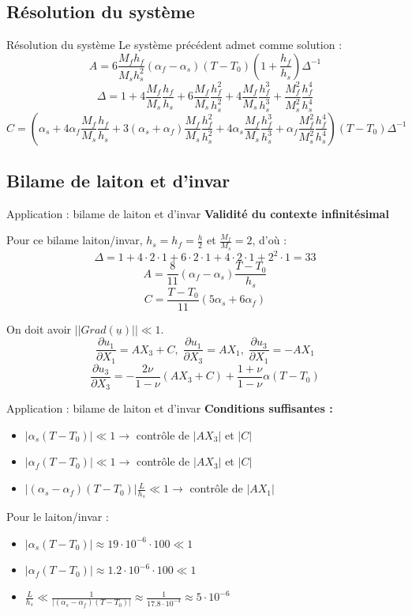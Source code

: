 \documentclass{beamer}
\begin{document}
\subsection{Résolution du système}

\begin{frame}{Résolution du système}
    Le système précédent admet comme solution :
    $$A = 6\frac{M_fh_f}{M_sh_{s}^{2}}(\alpha_f-\alpha_s)(T-T_0)(1+\frac{h_f}{h_s})\Delta^{-1}$$
    $$\Delta = 1+4\frac{M_f}{M_s}\frac{h_f}{h_s}+6\frac{M_f}{M_s}\frac{h_f^2}{h_s^2}+4\frac{M_f}{M_s}\frac{h_f^3}{h_s^3}+\frac{M_f^2}{M_s^2}\frac{h_f^4}{h_s^4}$$
    $$C = (\alpha_s+4\alpha_f\frac{M_f}{M_s}\frac{h_f}{h_s}+3(\alpha_s+\alpha_f)\frac{M_f}{M_s}\frac{h_f^2}{h_s^2}+4\alpha_s\frac{M_f}{M_s}\frac{h_f^3}{h_s^3}+\alpha_f\frac{M_f^2}{M_s^2}\frac{h_f^4}{h_s^4})(T-T_0)\Delta^{-1}$$
\end{frame}

\subsection{Bilame de laiton et d'invar}

\begin{frame}{Application : bilame de laiton et d'invar}
    \textbf{\Large{Validité du contexte infinitésimal}}
    
    Pour ce bilame laiton/invar, $h_s = h_f = \frac{h}{2}$ et $\frac{M_f}{M_s} = 2$, d'où :
    $$\Delta = 1+4\cdot2\cdot1+6\cdot2\cdot1+4\cdot2\cdot1+2^{2}\cdot1 = 33$$
    $$A = \frac{8}{11}(\alpha_f-\alpha_s)\frac{T-T_0}{h_s}$$
    $$C = \frac{T-T_0}{11}(5\alpha_s+6\alpha_f)$$
    
    On doit avoir $||Grad(\underline{u})|| \ll 1$.
    $$\frac{\partial u_1}{\partial X_1} = A X_3+C,\; \frac{\partial u_1}{\partial X_3} = A X_1,\; \frac{\partial u_3}{\partial X_1} = -A X_1$$
    $$\frac{\partial u_3}{\partial X_3} = -\frac{2\nu}{1-\nu}(A X_3 + C) + \frac{1+\nu}{1-\nu}\alpha(T-T_0)$$
\end{frame}

\begin{frame}{Application : bilame de laiton et d'invar}
    \textbf{Conditions suffisantes :}
    \begin{itemize}
        \item $|\alpha_s(T-T_0)|\ll 1 \rightarrow$ contrôle de $|A X_3|$ et $|C|$
        \item $|\alpha_f(T-T_0)|\ll 1 \rightarrow$ contrôle de $|A X_3|$ et $|C|$
        \item $|(\alpha_s-\alpha_f)(T-T_0)|\frac{L}{h_s}\ll 1 \rightarrow$ contrôle de $|A X_1|$
    \end{itemize}
    Pour le laiton/invar :
    \begin{itemize}
        \item $|\alpha_s(T-T_0)|\approx19\cdot10^{-6}\cdot100\ll1$
        \item $|\alpha_f(T-T_0)|\approx1.2\cdot10^{-6}\cdot100\ll1$
        \item $\frac{L}{h_s}\ll \frac{1}{|(\alpha_s-\alpha_f)(T-T_0)|} \approx \frac{1}{17.8\cdot 10^{-4}}\approx 5\cdot 10^{-6}$
    \end{itemize}
\end{frame}
\end{document}
